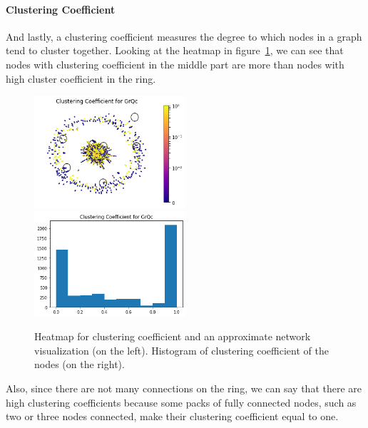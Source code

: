 \documentclass[letterpaper, 11pt]{article}
\newcommand{\1}{\mathds{1}}	%
\theoremstyle{definition}
\begin{document}
\paragraph{Clustering Coefficient} And lastly, a clustering coefficient measures the degree to which nodes in a graph tend to cluster together. Looking at the heatmap in figure~\ref{fig:clustering}, we can see that nodes with clustering coefficient in the middle part are more than nodes with high cluster coefficient in the ring.
\begin{figure}[h]
\includegraphics[width=0.5\textwidth]{GrQc_clustering.png}
\includegraphics[width=0.5\textwidth]{GrQc_clustering_hist.png}
\captionsetup{justification=centering,margin=0.5cm}
\caption{Heatmap for clustering coefficient and an approximate network visualization (on the left). Histogram of clustering coefficient of the nodes (on the right).}
\label{fig:clustering}
\end{figure}
Also, since there are not many connections on the ring, we can say that there are high clustering coefficients because some packs of fully connected nodes, such as two or three nodes connected, make their clustering coefficient equal to one. 
\end{document}

